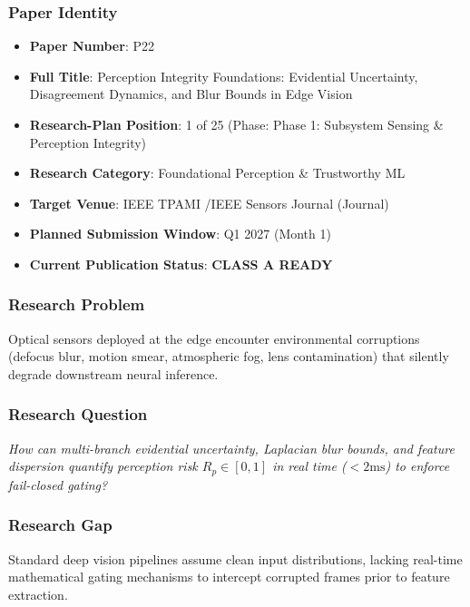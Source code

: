 \documentclass[11pt,letterpaper]{article}
\begin{document}
\subsubsection{Paper Identity}
\begin{itemize}[leftmargin=*]
    \item \textbf{Paper Number}: P22
    \item \textbf{Full Title}: Perception Integrity Foundations: Evidential Uncertainty, Disagreement Dynamics, and Blur Bounds in Edge Vision
    \item \textbf{Research-Plan Position}: 1 of 25 (Phase: Phase 1: Subsystem Sensing \& Perception Integrity)
    \item \textbf{Research Category}: Foundational Perception \& Trustworthy ML
    \item \textbf{Target Venue}: IEEE TPAMI /\allowbreak  IEEE Sensors Journal (Journal)
    \item \textbf{Planned Submission Window}: Q1 2027 (Month 1)
    \item \textbf{Current Publication Status}: \textbf{CLASS A READY}
\end{itemize}

\subsubsection{Research Problem}
Optical sensors deployed at the edge encounter environmental corruptions (defocus blur, motion smear, atmospheric fog, lens contamination) that silently degrade downstream neural inference.

\subsubsection{Research Question}
\begin{tcolorbox}[colback=blue!3!white,colframe=blue!50!black,title=Primary Scientific Question]
\textit{How can multi-\allowbreak branch evidential uncertainty, Laplacian blur bounds, and feature dispersion quantify perception risk $R_p \in [0, 1]$ in real time ($<2\text{ms}$) to enforce fail-\allowbreak closed gating?}
\end{tcolorbox}

\subsubsection{Research Gap}
Standard deep vision pipelines assume clean input distributions, lacking real-\allowbreak time mathematical gating mechanisms to intercept corrupted frames prior to feature extraction.
\end{document}
